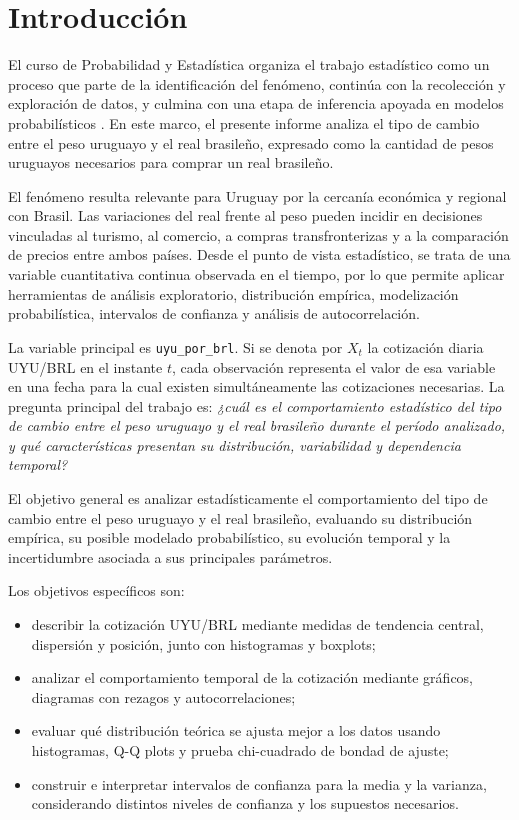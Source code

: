 \section{Introducción}

El curso de Probabilidad y Estadística organiza el trabajo estadístico como un proceso que parte de la identificación del fenómeno, continúa con la recolección y exploración de datos, y culmina con una etapa de inferencia apoyada en modelos probabilísticos \cite{curso_intro}. En este marco, el presente informe analiza el tipo de cambio entre el peso uruguayo y el real brasileño, expresado como la cantidad de pesos uruguayos necesarios para comprar un real brasileño.

El fenómeno resulta relevante para Uruguay por la cercanía económica y regional con Brasil. Las variaciones del real frente al peso pueden incidir en decisiones vinculadas al turismo, al comercio, a compras transfronterizas y a la comparación de precios entre ambos países. Desde el punto de vista estadístico, se trata de una variable cuantitativa continua observada en el tiempo, por lo que permite aplicar herramientas de análisis exploratorio, distribución empírica, modelización probabilística, intervalos de confianza y análisis de autocorrelación.

La variable principal es \texttt{uyu\_por\_brl}. Si se denota por \(X_t\) la cotización diaria UYU/BRL en el instante \(t\), cada observación representa el valor de esa variable en una fecha para la cual existen simultáneamente las cotizaciones necesarias. La pregunta principal del trabajo es: \textit{¿cuál es el comportamiento estadístico del tipo de cambio entre el peso uruguayo y el real brasileño durante el período analizado, y qué características presentan su distribución, variabilidad y dependencia temporal?}

El objetivo general es analizar estadísticamente el comportamiento del tipo de cambio entre el peso uruguayo y el real brasileño, evaluando su distribución empírica, su posible modelado probabilístico, su evolución temporal y la incertidumbre asociada a sus principales parámetros.

Los objetivos específicos son:

\begin{itemize}
    \item describir la cotización UYU/BRL mediante medidas de tendencia central, dispersión y posición, junto con histogramas y boxplots;
    \item analizar el comportamiento temporal de la cotización mediante gráficos, diagramas con rezagos y autocorrelaciones;
    \item evaluar qué distribución teórica se ajusta mejor a los datos usando histogramas, Q-Q plots y prueba chi-cuadrado de bondad de ajuste;
    \item construir e interpretar intervalos de confianza para la media y la varianza, considerando distintos niveles de confianza y los supuestos necesarios.
\end{itemize}

